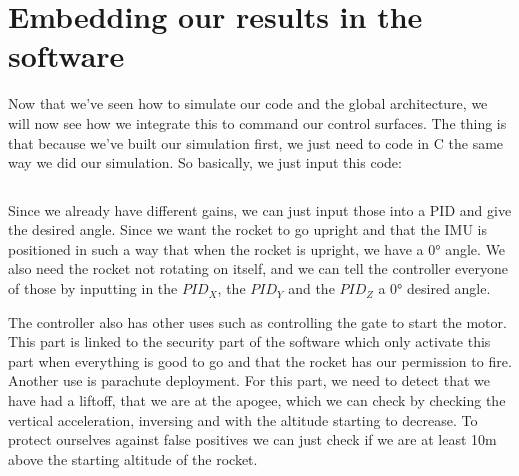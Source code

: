 \section{Embedding our results in the software}

Now that we've seen how to simulate our code and the global architecture, we
will now see how we integrate this to command our control surfaces. The thing
is that because we've built our simulation first, we just need to code in C
the same way we did our simulation. So basically, we just input this code:

\inputminted[linenos, firstline=1, lastline=29]{c}{\RawCode/code.c}

Since we already have different gains, we can just input those into a PID
and give the desired angle. Since we want the rocket to go upright and that
the IMU is positioned in such a way that when the rocket is upright, we have
a $0 \si{\degree}$ angle. We also need the rocket not rotating on itself, and
we can tell the controller everyone of those by inputting in the $PID_X$,
the $PID_Y$ and the $PID_Z$ a $0 \si{\degree}$ desired angle.

The controller also has other uses such as controlling the gate to start the
motor. This part is linked to the security part of the software which only
activate this part when everything is good to go and that the rocket has our
permission to fire.
Another use is parachute deployment. For this part, we need to detect that
we have had a liftoff, that we are at the apogee, which we can check by
checking the vertical acceleration, inversing and with the altitude starting
to decrease. To protect ourselves against false positives we can just check
if we are at least 10m above the starting altitude of the rocket.
